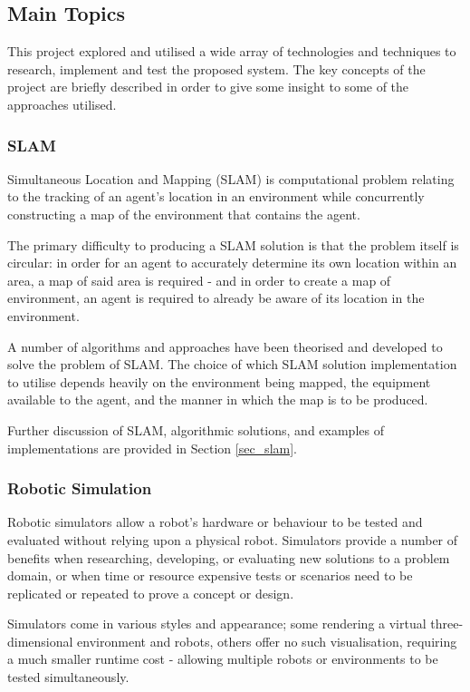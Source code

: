 \subsection{Main Topics}
This project explored and utilised a wide array of technologies and techniques
to research, implement and test the proposed system.
The key concepts of the project are briefly described in order to give some
insight to some of the approaches utilised.

\subsubsection{SLAM}
Simultaneous Location and Mapping (SLAM) is computational problem relating
to the tracking of an agent's location in an environment while concurrently
constructing a map of the environment that contains the agent.

The primary difficulty to producing a SLAM solution is that the problem itself
is circular: in order for an agent to accurately determine its own location
within an area, a map of said area is required - and in order to create a map
of environment, an agent is required to already be aware of its location in the
environment.

A number of algorithms and approaches have been theorised and developed to
solve the problem of SLAM.
The choice of which SLAM solution implementation to utilise depends heavily
on the environment being mapped, the equipment available to the agent, and the
manner in which the map is to be produced.

Further discussion of SLAM, algorithmic solutions, and examples of
implementations are provided in Section \ref{sec_slam}.


\subsubsection{Robotic Simulation}
Robotic simulators allow a robot's hardware or behaviour to be tested and
evaluated without relying upon a physical robot.
Simulators provide a number of benefits when researching, developing, or
evaluating new solutions to a problem domain, or when time or resource
expensive tests or scenarios need to be replicated or repeated to prove a
concept or design.

Simulators come in various styles and appearance; some rendering a virtual
three-dimensional  environment and robots, others offer no such visualisation,
requiring a much smaller runtime cost - allowing multiple robots or
environments to be tested simultaneously.

